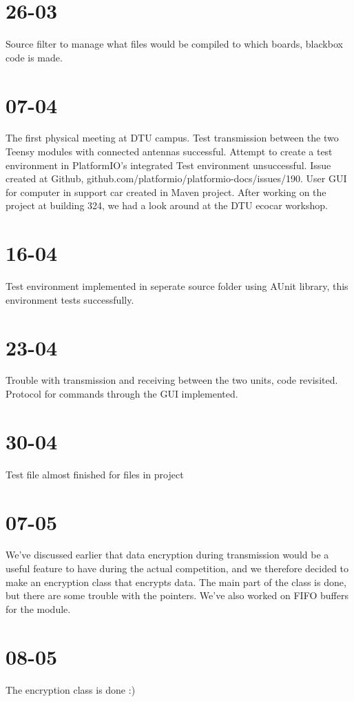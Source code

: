\documentclass[]{article}
\begin{document}
\section{26-03}
Source filter to manage what files would be compiled to which boards, blackbox code is made.

\section{07-04}
The first physical meeting at DTU campus. Test transmission between the two Teensy modules with connected antennas successful. Attempt to create a test environment in PlatformIO's integrated Test environment unsuccessful. Issue created at Github, github.com/platformio/platformio-docs/issues/190. User GUI for computer in support car created in Maven project. After working on the project at building 324, we had a look around at the DTU ecocar workshop.

\section{16-04}
Test environment implemented in seperate source folder using AUnit library, this environment tests successfully.

\section{23-04}
Trouble with transmission and receiving between the two units, code revisited. Protocol for commands through the GUI implemented.

\section{30-04}
Test file almost finished for files in project

\section{07-05}
We've discussed earlier that data encryption during transmission would be a useful feature to have during the actual competition, and we therefore decided to make an encryption class that encrypts data. The main part of the class is done, but there are some trouble with the pointers. We've also worked on FIFO buffers for the module.

\section{08-05}
The encryption class is done :)
\end{document}
